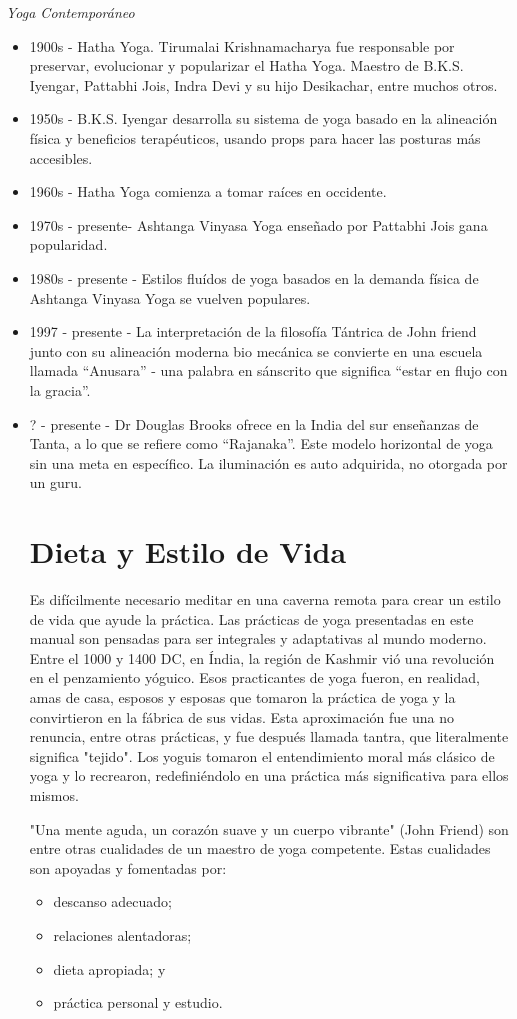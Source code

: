 \textit{Yoga Contemporáneo}
\begin{itemize}
	\item 1900s - Hatha Yoga. Tirumalai Krishnamacharya fue responsable por preservar, evolucionar y popularizar el Hatha Yoga. Maestro de B.K.S. Iyengar, Pattabhi Jois, Indra Devi y su hijo Desikachar, entre muchos otros.
	\item 1950s - B.K.S. Iyengar desarrolla su sistema de yoga basado en la alineación física y beneficios terap\'euticos, usando props para hacer las posturas más accesibles.
	\item 1960s - Hatha Yoga comienza a tomar raíces en occidente.
	\item 1970s - presente- Ashtanga Vinyasa Yoga enseñado por Pattabhi Jois gana popularidad.
	\item 1980s - presente - Estilos fluídos de yoga basados en la demanda física de Ashtanga Vinyasa Yoga se vuelven populares.
	\item 1997 - presente - La interpretación de la filosofía Tántrica de John friend junto con su alineación moderna bio mecánica se convierte en una escuela llamada ``Anusara'' - una palabra en sánscrito que significa ``estar en flujo con la gracia''.
	\item ? - presente - Dr Douglas Brooks ofrece en la India del sur enseñanzas de Tanta, a lo que se refiere como ``Rajanaka''. Este modelo horizontal de yoga sin una meta en específico. La iluminación es auto adquirida, no otorgada por un guru.

\section{Dieta y Estilo de Vida}
Es difícilmente necesario meditar en una caverna remota para crear un estilo de vida que ayude la práctica. Las prácticas de yoga presentadas en este manual son pensadas para ser integrales y adaptativas al mundo moderno. Entre el 1000 y 1400 DC, en Índia, la región de Kashmir vió una revolución en el penzamiento yóguico. Esos practicantes de yoga fueron, en realidad, amas de casa, esposos y esposas que tomaron la práctica de yoga y la convirtieron en la fábrica de sus vidas. Esta aproximación fue una no renuncia, entre otras prácticas, y fue después llamada tantra, que literalmente significa "tejido". Los yoguis tomaron el entendimiento moral más clásico de yoga y lo recrearon, redefiniéndolo en una práctica más significativa para ellos mismos.

"Una mente aguda, un corazón suave y un cuerpo vibrante" (John Friend) son entre otras cualidades de un maestro de yoga competente. Estas cualidades son apoyadas y fomentadas por:
\begin{itemize}
	\item descanso adecuado;
	\item relaciones alentadoras;
	\item dieta apropiada; y
	\item práctica personal y estudio.
\end{itemize}


\end{itemize}
